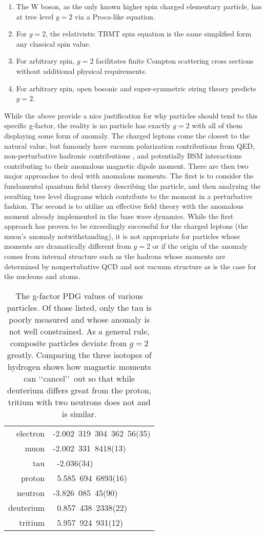 \begin{enumerate}
	\item The W boson, as the only known higher spin charged elementary particle, has at tree level $g=2$ via a Proca-like equation.
	\item For $g=2$, the relativistic TBMT spin equation is the same simplified form any classical spin value.
	\item For arbitrary spin, $g=2$ facilitates finite Compton scattering cross sections without additional physical requirements.
	\item For arbitrary spin, open bosonic and super-symmetric string theory predicts $g=2$.
\end{enumerate}
While the above provide a nice justification for why particles should tend to this specific g-factor, the reality is no particle has exactly $g=2$ with all of them displaying some form of anomaly. The charged leptons come the closest to the natural value, but famously have vacuum polarization contributions \cite{Schwinger:1951nm} from QED, non-perturbative hadronic contributions \cite{Jegerlehner:2001wq,Jegerlehner:2017gek}, and potentially BSM interactions \cite{Czarnecki:2001pv,Knecht:2004,Jegerlehner:2009ry} contributing to their anomalous magnetic dipole moment. There are then two major approaches to deal with anomalous moments. The first is to consider the fundamental quantum field theory describing the particle, and then analyzing the resulting tree level diagrams which contribute to the moment in a perturbative fashion. The second is to utilize an effective field theory with the anomalous moment already implemented in the base wave dynamics. While the first approach has proven to be exceedingly successful for the charged leptons (the muon's anomaly notwithstanding), it is not appropriate for particles whose moments are dramatically different from $g=2$ or if the origin of the anomaly comes from internal structure such as the hadrons whose moments are determined by nonpertubative QCD \cite{Eichmann:2016yit,Pacetti:2014jai} and not vacuum structure as is the case for the nucleons and atoms.

\begin{table}
	\centering
\begin{tabular}{|r|l|}
	electron & -2.002\ 319\ 304\ 362\ 56(35)\\
	muon & -2.002\ 331\ 8418(13)\\
	tau & \ -2.036(34)\\
	proton & \ 5.585\ 694\ 6893(16)\\
	neutron & -3.826\ 085\ 45(90)\\
	deuterium & \ 0.857\ 438\ 2338(22)\\
	tritium & \ 5.957\ 924\ 931(12)
\end{tabular}
	\caption{The g-factor PDG values of various particles. Of those listed, only the tau is poorly measured and whose anomaly is not well constrained. As a general rule, composite particles deviate from $g=2$ greatly. Comparing the three isotopes of hydrogen shows how magnetic moments can \lq\lq cancel\rq\rq\ out so that while deuterium differs great from the proton, tritium with two neutrons does not and is similar.}
	\label{ajs:table:01}
\end{table}